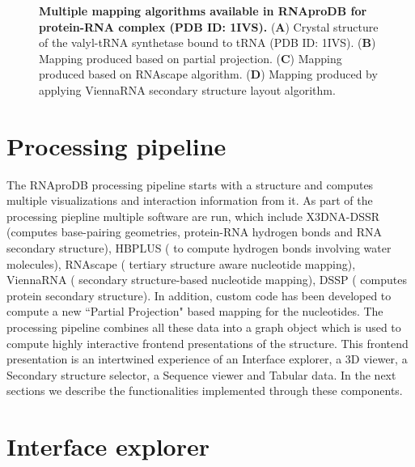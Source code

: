 \begin{center}
    \begin{figure}
        \caption[Multiple mapping algorithms available in RNAproDB for protein-RNA complex (PDB ID: 1IVS)]{\textbf{Multiple mapping algorithms available in RNAproDB for protein-RNA complex (PDB ID: 1IVS).} ({\bf A}) Crystal structure of the valyl-tRNA synthetase bound to tRNA (PDB ID: 1IVS).  ({\bf B})  Mapping produced based on partial projection. ({\bf C}) Mapping produced based on RNAscape algorithm. ({\bf D}) Mapping produced by applying ViennaRNA secondary structure layout algorithm. }
  \label{fig:rnaprodb1}
\end{figure}
\end{center}

\section{Processing pipeline}
The RNAproDB processing pipeline starts with a structure and computes multiple visualizations and interaction information from it. As part of the processing piepline multiple software are run, which include X3DNA-DSSR (\citep{Lu2015}computes base-pairing geometries, protein-RNA hydrogen bonds and RNA secondary structure), HBPLUS (\citep{McDonald1994} to compute hydrogen bonds involving water molecules), RNAscape (\citep{Mitra2024rnascape} tertiary structure aware nucleotide mapping), ViennaRNA (\citep{Lorenz2011} secondary structure-based nucleotide mapping), DSSP (\citep{joosten2010series, kabsch1983dictionary} computes protein secondary structure). In addition, custom code has been developed to compute a new ``Partial Projection" based mapping for the nucleotides. The processing pipeline combines all these data into a graph object which is used to compute highly interactive frontend presentations of the structure. This frontend presentation is an intertwined experience of an Interface explorer, a 3D viewer, a Secondary structure selector, a Sequence viewer and Tabular data. In the next sections we describe the functionalities implemented through these components.

\section{Interface explorer}

